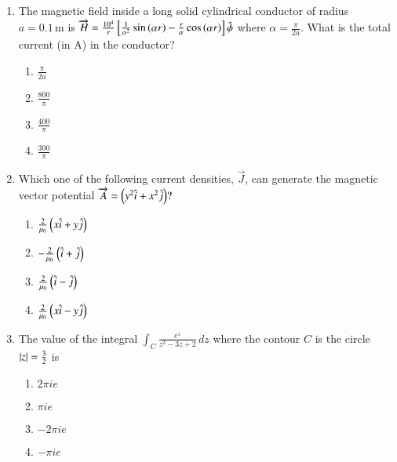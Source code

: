 \documentclass[journal,9pt,onecolumn]{IEEEtran}
\begin{document}
\begin{enumerate}
\item The magnetic field  inside a long solid cylindrical conductor of radius $a = 0.1 \, \text{m}$ is $\overrightarrow{H} = \frac{10^4}{r} {}\left[\frac{1}{\alpha^2} \sin\left(\alpha r\right) - \frac{r}{\alpha} \cos\left(\alpha r\right)\right] \hat{\phi}$ where $\alpha = \frac{\pi}{2a}$. What is the total current (in A) in the conductor?
\begin{multicols}{4}
\begin{enumerate}
    \item $\frac{\pi}{2a}$
    \item $\frac{800}{\pi}$
    \item $\frac{400}{\pi}$
    \item $\frac{300}{\pi}$
\end{enumerate}
\end{multicols}

\item Which one of the following current densities, $\overrightarrow{J}$, can generate the magnetic vector potential $\overrightarrow{A} = \left(y^2 \hat{i} + x^2 \hat{j}\right)?$
\begin{multicols}{4}
\begin{enumerate}
    \item $\frac{2}{\mu_0} \left(x \hat{i} + y \hat{j}\right)$
    \item $-\frac{2}{\mu_0} \left( \hat{i} +  \hat{j}\right)$
    \item $\frac{2}{\mu_0} \left( \hat{i}  - \hat{j}\right)$
    \item $\frac{2}{\mu_0} \left(x \hat{i} - y \hat{j}\right)$
    
\end{enumerate}
\end{multicols}


\item The value of the integral $\int_{C} \frac{e^z}{z^2 - 3z + 2} \, dz$ where the contour $C$ is the circle $\left\vert z\right\vert = \frac{3}{2}$ is
\begin{multicols}{4}    
\begin{enumerate}
    \item $2\pi i e$
    \item $\pi i e$
    \item $-2 \pi i e$
    \item $- \pi i e$
\end{enumerate}
\end{multicols}



\end{enumerate}
\end{document}
